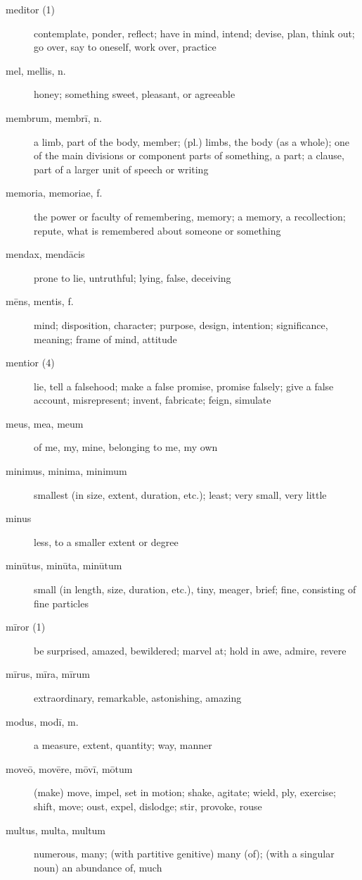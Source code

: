 \begin{description}
    \item[meditor (1)] contemplate, ponder, reflect; have in mind, intend; devise, plan, think out; go over, say to oneself, work over, practice
    \item[mel, mellis, n.] honey; something sweet, pleasant, or agreeable
    \item[membrum, membrī, n.] \marginnote{*}a limb, part of the body, member; (pl.) limbs, the body (as a whole); one of the main divisions or component parts of something, a part; a clause, part of a larger unit of speech or writing
    \item[memoria, memoriae, f.] \marginnote{*}the power or faculty of remembering, memory; a memory, a recollection; repute, what is remembered about someone or something
    \item[mendax, mendācis] prone to lie, untruthful; lying, false, deceiving
    \item[mēns, mentis, f.] \marginnote{*}mind; disposition, character; purpose, design, intention; significance, meaning; frame of mind, attitude
    \item[mentior (4)] lie, tell a falsehood; make a false promise, promise falsely; give a false account, misrepresent; invent, fabricate; feign, simulate
    \item[meus, mea, meum] \marginnote{*}of me, my, mine, belonging to me, my own
    \item[minimus, minima, minimum] \marginnote{*}smallest (in size, extent, duration, etc.); least; very small, very little
    \item[minus] \marginnote{*}less, to a smaller extent or degree
    \item[minūtus, minūta, minūtum] small (in length, size, duration, etc.), tiny, meager, brief; fine, consisting of fine particles
    \item[mīror (1)] \marginnote{*}be surprised, amazed, bewildered; marvel at; hold in awe, admire, revere
    \item[mīrus, mīra, mīrum] extraordinary, remarkable, astonishing, amazing
    \item[modus, modī, m.] \marginnote{*}a measure, extent, quantity; way, manner
    \item[moveō, movēre, mōvī, mōtum] \marginnote{*}(make) move, impel, set in motion; shake, agitate; wield, ply, exercise; shift, move; oust, expel, dislodge; stir, provoke, rouse
    \item[multus, multa, multum] \marginnote{*}numerous, many; (with partitive genitive) many (of); (with a singular noun) an abundance of, much

\end{description}
